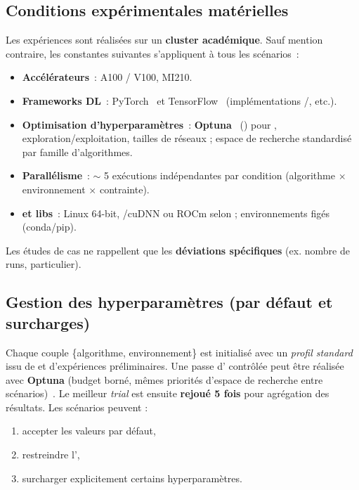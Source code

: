 \subsection{Conditions expérimentales matérielles}
\label{par:compute_conditions}
Les expériences sont réalisées sur un \textbf{cluster  académique}. Sauf mention contraire, les constantes suivantes s'appliquent à tous les scénarios~:
\begin{itemize}
  \item \textbf{Accélérateurs}~:  A100 / V100,  MI210.
  \item \textbf{Frameworks DL}~: PyTorch~\cite{Paszke2019} et TensorFlow~\cite{Abadi2016} (implémentations /, etc.).
  \item \textbf{Optimisation d'hyperparamètres}~: \textbf{Optuna}~\cite{akiba2019optuna} () pour , exploration/exploitation, tailles de réseaux ; espace de recherche standardisé par famille d'algorithmes.
  \item \textbf{Parallélisme}~: $\sim$ 5 exécutions indépendantes par condition (algorithme $\times$ environnement $\times$ contrainte).
  \item \textbf{ et libs}~: Linux 64-bit, /cuDNN ou ROCm selon  ; environnements figés (conda/pip).
\end{itemize}
Les études de cas ne rappellent que les \textbf{déviations spécifiques} (ex. nombre de runs,  particulier).

\subsection{Gestion des hyperparamètres (par défaut et surcharges)}
Chaque couple \{algorithme, environnement\} est initialisé avec un \textit{profil standard} issu de  et d'expériences préliminaires.
Une passe d' contrôlée peut être réalisée avec \textbf{Optuna} (budget borné, mêmes priorités d'espace de recherche entre scénarios)~\cite{akiba2019optuna}. Le meilleur \textit{trial} est ensuite \textbf{rejoué 5 fois} pour agrégation des résultats.
Les scénarios peuvent :
\begin{enumerate}[label=\alph*)]
  \item accepter les valeurs par défaut,
  \item restreindre l',
  \item surcharger explicitement certains hyperparamètres.
\end{enumerate}


